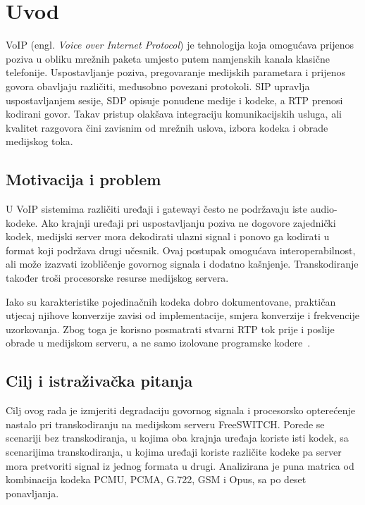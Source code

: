 \chapter{Uvod}
\label{ch:uvod}

VoIP (engl. \emph{Voice over Internet Protocol}) je tehnologija koja omogućava prijenos poziva u obliku mrežnih paketa umjesto putem namjenskih kanala klasične telefonije. Uspostavljanje poziva, pregovaranje medijskih parametara i prijenos govora obavljaju različiti, međusobno povezani protokoli. SIP upravlja uspostavljanjem sesije, SDP opisuje ponuđene medije i kodeke, a RTP prenosi kodirani govor. Takav pristup olakšava integraciju komunikacijskih usluga, ali kvalitet razgovora čini zavisnim od mrežnih uslova, izbora kodeka i obrade medijskog toka.

\section{Motivacija i problem}

U VoIP sistemima različiti uređaji i gatewayi često ne podržavaju iste audio-kodeke. Ako krajnji uređaji pri uspostavljanju poziva ne dogovore zajednički kodek, medijski server mora dekodirati ulazni signal i ponovo ga kodirati u format koji podržava drugi učesnik. Ovaj postupak omogućava interoperabilnost, ali može izazvati izobličenje govornog signala i dodatno kašnjenje. Transkodiranje također troši procesorske resurse medijskog servera.

Iako su karakteristike pojedinačnih kodeka dobro dokumentovane, praktičan utjecaj njihove konverzije zavisi od implementacije, smjera konverzije i frekvencije uzorkovanja. Zbog toga je korisno posmatrati stvarni RTP tok prije i poslije obrade u medijskom serveru, a ne samo izolovane programske kodere~\cite{tandem-encoding}.

\section{Cilj i istraživačka pitanja}

Cilj ovog rada je izmjeriti degradaciju govornog signala i procesorsko opterećenje nastalo pri transkodiranju na medijskom serveru FreeSWITCH. Porede se scenariji bez transkodiranja, u kojima oba krajnja uređaja koriste isti kodek, sa scenarijima transkodiranja, u kojima uređaji koriste različite kodeke pa server mora pretvoriti signal iz jednog formata u drugi. Analizirana je puna matrica od \BrojKonfiguracija{} kombinacija kodeka PCMU, PCMA, G.722, GSM i Opus, sa po deset ponavljanja.

